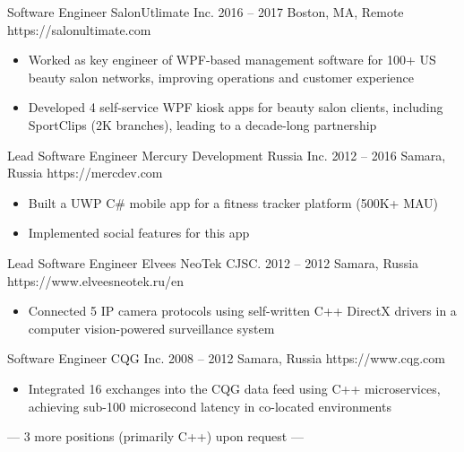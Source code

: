\documentclass[9pt,a4paper]{juicv}
\begin{document}
\begin{paracol}{2}
    \cvLeftEvent
        {Software Engineer}
        {SalonUtlimate Inc.}
        {2016 -- 2017}
        {Boston, MA, Remote}
        {https://salonultimate.com}

        \begin{itemize}
            \item Worked as key engineer of WPF-based management software
                  for 100+ US beauty salon networks, improving operations and customer experience
            \item Developed 4 self-service WPF kiosk apps for beauty salon clients,
                  including SportClips (2K branches), leading to a decade-long partnership
        \end{itemize}

    \cvLeftEvent
        {Lead Software Engineer}
        {Mercury Development Russia Inc.}
        {2012 -- 2016}
        {Samara, Russia}
        {https://mercdev.com}

        \begin{itemize}
            \item Built a UWP C\# mobile app for a fitness tracker platform (500K+ MAU)
            \item Implemented social features for this app
        \end{itemize}

    \cvLeftEvent
        {Lead Software Engineer}
        {Elvees NeoTek CJSC.}
        {2012 -- 2012}
        {Samara, Russia}
        {https://www.elveesneotek.ru/en}

        \begin{itemize}
            \item Connected 5 IP camera protocols using self-written C++ DirectX drivers
                  in a computer vision-powered surveillance system
        \end{itemize}

    \cvLeftEvent
        {Software Engineer}
        {CQG Inc.}
        {2008 -- 2012}
        {Samara, Russia}
        {https://www.cqg.com}

        \begin{itemize}
            \item Integrated 16 exchanges into the CQG data feed using C++ microservices,
                  achieving sub-100 microsecond latency in co-located environments
        \end{itemize}

        {
            \vspace{6pt}
            \centering
            \footnotesize
            \color{secondaryTextColor}
            --- 3 more positions (primarily C++) upon request ---
            \par
        }


\end{paracol}
\end{document}
